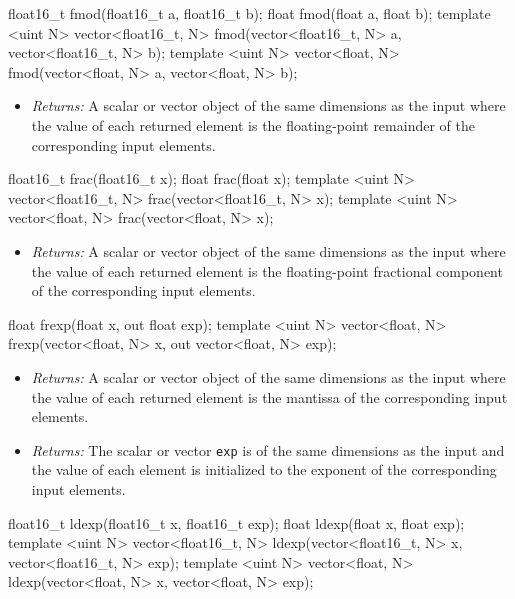 \begin{HLSL}
float16_t fmod(float16_t a, float16_t b);
float fmod(float a, float b);
template <uint N>
vector<float16_t, N> fmod(vector<float16_t, N> a, vector<float16_t, N> b);
template <uint N> vector<float, N> fmod(vector<float, N> a, vector<float, N> b);
\end{HLSL}

\begin{itemize}
  \item \textit{Returns:} A scalar or vector object of the same dimensions as
  the input where the value of each returned element is the floating-point
  remainder of the corresponding input elements.
\end{itemize}

\begin{HLSL}
float16_t frac(float16_t x);
float frac(float x);
template <uint N> vector<float16_t, N> frac(vector<float16_t, N> x);
template <uint N> vector<float, N> frac(vector<float, N> x);
\end{HLSL}

\begin{itemize}
  \item \textit{Returns:} A scalar or vector object of the same dimensions as
  the input where the value of each returned element is the floating-point
  fractional component of the corresponding input elements.
\end{itemize}

\begin{HLSL}
float frexp(float x, out float exp);
template <uint N>
vector<float, N> frexp(vector<float, N> x, out vector<float, N> exp);
\end{HLSL}

\begin{itemize}
  \item \textit{Returns:} A scalar or vector object of the same dimensions as
  the input where the value of each returned element is the mantissa of the
  corresponding input elements.
  \item \textit{Returns:} The scalar or vector \texttt{exp} is of the same
  dimensions as the input and the value of each element is initialized to the
  exponent of the corresponding input elements.
\end{itemize}

\begin{HLSL}
float16_t ldexp(float16_t x, float16_t exp);
float ldexp(float x, float exp);
template <uint N>
vector<float16_t, N> ldexp(vector<float16_t, N> x, vector<float16_t, N> exp);
template <uint N>
vector<float, N> ldexp(vector<float, N> x, vector<float, N> exp);
\end{HLSL}

